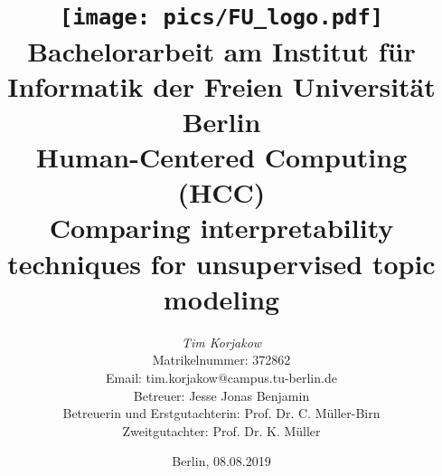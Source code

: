 %
\begin{titlepage}

\title{\texttt{[image: pics/FU\_logo.pdf]}\\
{\small Bachelorarbeit am Institut für Informatik der Freien Universität Berlin}\\
{\small Human-Centered Computing (HCC)}\\
[6ex]
{\LARGE Comparing interpretability techniques for unsupervised topic modeling}}

\author{
{\emph{\normalsize Tim Korjakow}}\\
{\normalsize Matrikelnummer: 372862}\\
{\normalsize Email: tim.korjakow@campus.tu-berlin.de}\\ 
[18ex]   
{\normalsize Betreuer: Jesse Jonas Benjamin} \\
{\normalsize Betreuerin und Erstgutachterin: Prof. Dr. C. Müller-Birn} \\
{\normalsize Zweitgutachter: Prof. Dr. K. Müller}}
\vspace{6ex}
\date{\normalsize Berlin, 08.08.2019}
 
\maketitle  

\end{titlepage}